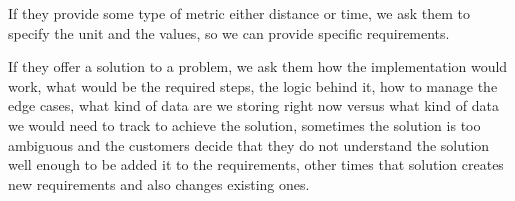 \noindent If they provide some type of metric either distance or time, we ask 
them to specify the unit and the values, so we can provide specific 
requirements.  \newline

\noindent If they offer a solution to a problem, we ask them how the 
implementation would work, what would be the required steps, the logic behind 
it, how to manage the edge cases, what kind of data are we storing right now 
versus what kind of data we would need to track to achieve the solution, 
sometimes the solution is too ambiguous and the customers decide that they do 
not understand the solution well enough to be added it to the requirements, 
other times that solution creates new requirements and also changes 
existing ones. \newline
